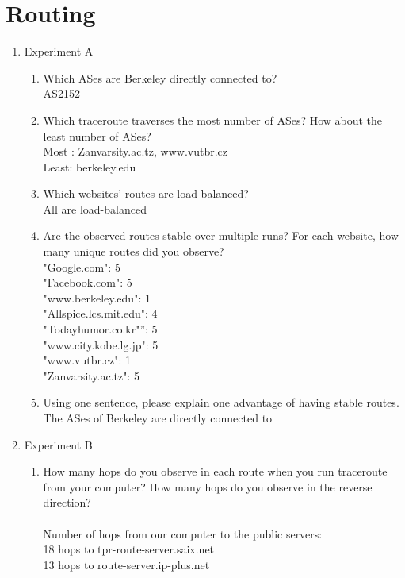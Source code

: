\documentclass{article}
\begin{document}
\section{Routing}
\begin{enumerate}
    \item Experiment A
    \begin{enumerate}
        \item Which ASes are Berkeley directly connected to?\\
        AS2152
        \item Which traceroute traverses the most number of ASes? How about the least number of ASes?\\
        Most : Zanvarsity.ac.tz, www.vutbr.cz\\
        Least: berkeley.edu
        \item Which websites' routes are load-balanced?\\
        All are load-balanced
        \item Are the observed routes stable over multiple runs? For each website, how many unique routes did you observe?\\
        "Google.com": 5\\
        "Facebook.com": 5\\
        "www.berkeley.edu": 1\\
        "Allspice.lcs.mit.edu": 4\\
        "Todayhumor.co.kr"”: 5\\
        "www.city.kobe.lg.jp": 5\\
        "www.vutbr.cz": 1\\
        "Zanvarsity.ac.tz": 5
        \item Using one sentence, please explain one advantage of having stable routes.\\
            The ASes of Berkeley are directly connected to
    \end{enumerate}
    \item Experiment B
    \begin{enumerate}
    \item How many hops do you observe in each route when you run traceroute from your computer? How many hops do you observe in the reverse direction?\\ \\
    Number of hops from our computer to the public servers:\\
    18 hops to tpr-route-server.saix.net\\
    13 hops to route-server.ip-plus.net\\

\end{enumerate}
\end{enumerate}
\end{document}

